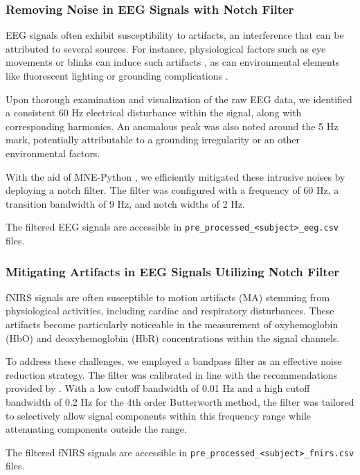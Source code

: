\subsubsection{Removing Noise in EEG Signals with Notch Filter}

EEG signals often exhibit susceptibility to artifacts, an interference that can be attributed to several sources. For instance, physiological factors such as eye movements or blinks can induce such artifacts \cite{10.3389/fnhum.2012.00278}, as can environmental elements like fluorescent lighting or grounding complications \cite{Kaya21}.

Upon thorough examination and visualization of the raw EEG data, we identified a consistent 60 Hz electrical disturbance within the signal, along with corresponding harmonics. An anomalous peak was also noted around the 5 Hz mark, potentially attributable to a grounding irregularity or an other environmental factors.

With the aid of MNE-Python \cite{GramfortEtAl2013a}, we efficiently mitigated these intrusive noises by deploying a notch filter. The filter was configured with a frequency of 60 Hz, a transition bandwidth of 9 Hz, and notch widths of 2 Hz.

The filtered EEG signals are accessible in \texttt{pre\_processed\_<subject>\_eeg.csv} files.

\subsubsection{Mitigating Artifacts in EEG Signals Utilizing Notch Filter}

fNIRS signals are often susceptible to motion artifacts (MA) stemming from physiological activities, including cardiac and respiratory disturbances. These artifacts become particularly noticeable in the measurement of oxyhemoglobin (HbO) and deoxyhemoglobin (HbR) concentrations within the signal channels.

To address these challenges, we employed a bandpass filter as an effective noise reduction strategy. The filter was calibrated in line with the recommendations provided by \cite{Koenraadt2014}. With a low cutoff bandwidth of 0.01 Hz and a high cutoff bandwidth of 0.2 Hz for the 4th order Butterworth method, the filter was tailored to selectively allow signal components within this frequency range while attenuating components outside the range.

The filtered fNIRS signals are accessible in \texttt{pre\_processed\_<subject>\_fnirs.csv} files.

